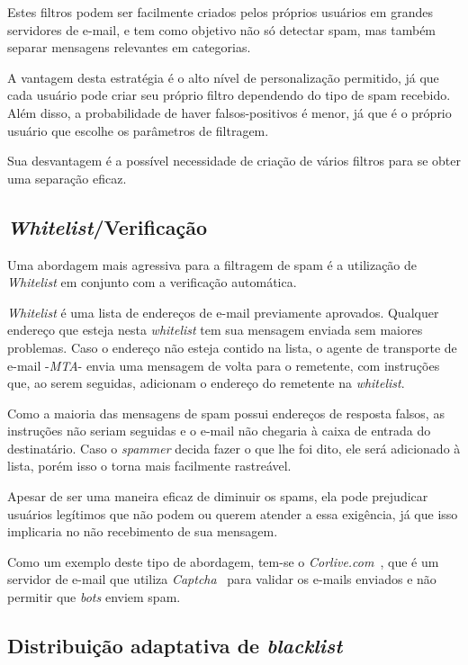 \documentclass{article}
\begin{document}
		Estes filtros podem ser facilmente criados pelos próprios usuários em grandes servidores de e-mail, e tem como objetivo não só detectar spam, mas também separar mensagens relevantes em categorias.

		A vantagem desta estratégia é o alto nível de personalização permitido, já que cada usuário pode criar seu próprio filtro dependendo do tipo de spam recebido. 
		Além disso, a probabilidade de haver falsos-positivos é menor, já que é o próprio usuário que escolhe os parâmetros de filtragem.
		
		Sua desvantagem é a possível necessidade de criação de vários filtros para se obter uma separação eficaz.


	\subsection{\emph{Whitelist}/Verificação}
		Uma abordagem mais agressiva para a filtragem de spam é a utilização de \emph{Whitelist} em conjunto com a verificação automática.

		\emph{Whitelist} é uma lista de endereços de e-mail previamente aprovados. 
		Qualquer endereço que esteja nesta \emph{whitelist} tem sua mensagem enviada sem maiores problemas.
		Caso o endereço não esteja contido na lista, o agente de transporte de e-mail -\emph{MTA}- envia uma mensagem de volta para o remetente, com instruções que, ao serem seguidas, adicionam o endereço do remetente na \emph{whitelist}.

		Como a maioria das mensagens de spam possui endereços de resposta falsos, as instruções não seriam seguidas e o e-mail não chegaria à caixa de entrada do destinatário.
		Caso o \emph{spammer} decida fazer o que lhe foi dito, ele será adicionado à lista, porém isso o torna mais facilmente rastreável.
		
		Apesar de ser uma maneira eficaz de diminuir os spams, ela pode prejudicar usuários legítimos que não podem ou querem atender a essa exigência, já que isso implicaria no não recebimento de sua mensagem.

		Como um exemplo deste tipo de abordagem, tem-se o \emph{Corlive.com}~\cite{corlive}, que é um servidor de e-mail que utiliza \emph{Captcha}~\cite{captcha} para validar os e-mails enviados e não permitir que \emph{bots} enviem spam.

	\subsection{Distribuição adaptativa de \emph{blacklist}}
\end{document}

